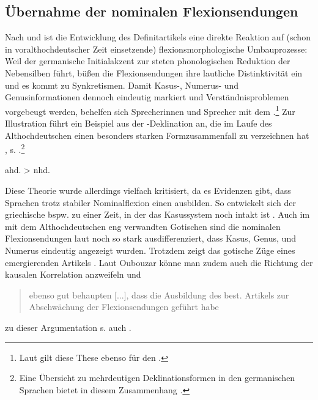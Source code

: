 \subsection{Übernahme der nominalen Flexionsendungen} \label{sec:flexion} 

Nach \textcite[168--170]{Tschirch1983} und \textcite[13]{vonPolenz2009} ist die Entwicklung des Definitartikels  eine direkte Reaktion auf (schon in voralthochdeutscher Zeit einsetzende) flexionsmorphologische  Umbauprozesse: Weil der germanische Initialakzent zur steten phonologischen Reduktion der Nebensilben führt, büßen die Flexionsendungen ihre lautliche Distinktivität ein und es kommt zu Synkretismen. Damit Kasus-, Numerus- und Genusinformationen dennoch eindeutig markiert und Verständnisproblemen vorgebeugt werden, behelfen sich Sprecherinnen und Sprecher mit dem .\footnote{Laut \textcite[70]{Schildt1981} gilt diese These ebenso für den .} Zur Illustration führt \textcite[13]{vonPolenz2009} ein Beispiel aus der -Deklination an, die im Laufe des Althochdeutschen einen besonders starken Formzusammenfall zu verzeichnen hat \parencite[248]{Meineke2001}, s. .\footnote{Eine Übersicht zu mehrdeutigen Deklinationsformen in den germanischen Sprachen bietet in diesem Zusammenhang \textcite[48--51]{Heinrichs1954}.} 
 
\begin{exe}
	\ex \label{ex:flexion}   
	ahd.  > nhd. 
\end{exe}

Diese Theorie wurde allerdings vielfach kritisiert, da es Evidenzen gibt, dass Sprachen trotz stabiler Nominalflexion  einen  ausbilden. So entwickelt sich der griechische  bspw. zu einer Zeit, in der das Kasussystem  noch intakt ist \parencite[44]{Ebert1978}. 
Auch im mit dem Althochdeutschen eng verwandten Gotischen sind die nominalen Flexionsendungen  laut \textcite[10]{Kovari1984} noch so stark ausdifferenziert, dass Kasus, Genus, und Numerus eindeutig angezeigt wurden. Trotzdem zeigt das gotische  Züge eines emergierenden Artikels \parencite[vgl.][114--155]{Leiss2000}. Laut Oubouzar könne man zudem auch die Richtung der kausalen Korrelation anzweifeln und \blockcquote[71]{Oubouzar1992}{ebenso gut behaupten
[...], dass die Ausbildung des best. Artikels zur Abschwächung der Flexionsendungen geführt habe}; zu dieser Argumentation s. auch \textcite[51]{Heinrichs1954}.  

